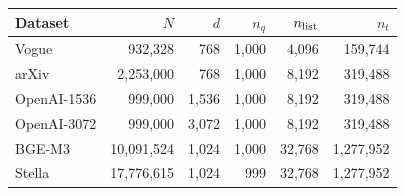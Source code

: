 \begin{tabular*}{\linewidth}{@{\extracolsep{\fill}}lrrrrr@{}}
\toprule
Dataset & $N$ & $d$ & $n_q$ & $n_{\rm list}$ & $n_t$ \\
\midrule
Vogue & 932,328 & 768 & 1,000 & 4,096 & 159,744 \\
arXiv & 2,253,000 & 768 & 1,000 & 8,192 & 319,488 \\
OpenAI-1536 & 999,000 & 1,536 & 1,000 & 8,192 & 319,488 \\
OpenAI-3072 & 999,000 & 3,072 & 1,000 & 8,192 & 319,488 \\
BGE-M3 & 10,091,524 & 1,024 & 1,000 & 32,768 & 1,277,952 \\
Stella & 17,776,615 & 1,024 & 999 & 32,768 & 1,277,952 \\
\bottomrule
\end{tabular*}

